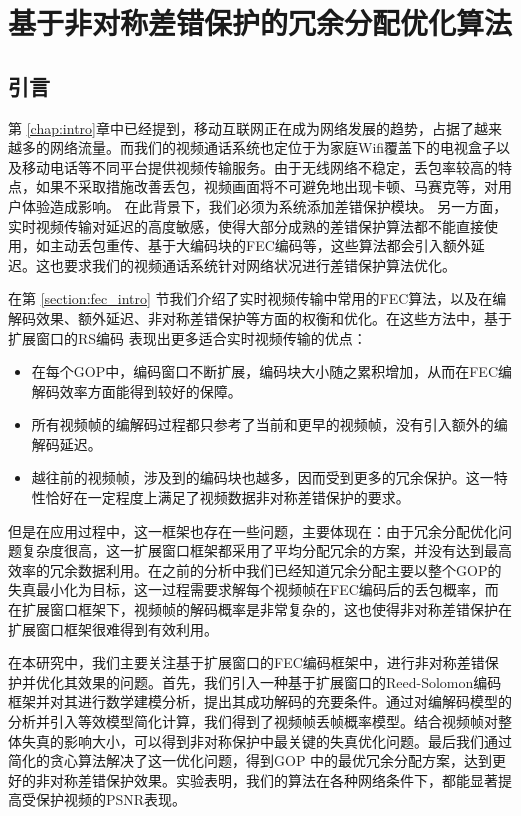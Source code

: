 \chapter{基于非对称差错保护的冗余分配优化算法}
\label{chap:fec}

\section{引言}
第 \ref{chap:intro}章中已经提到，移动互联网正在成为网络发展的趋势，占据了越来越多的网络流量。而我们的视频通话系统也定位于为家庭Wifi覆盖下的电视盒子以及移动电话等不同平台提供视频传输服务。由于无线网络不稳定，丢包率较高的特点，如果不采取措施改善丢包，视频画面将不可避免地出现卡顿、马赛克等，对用户体验造成影响。
在此背景下，我们必须为系统添加差错保护模块。
另一方面，实时视频传输对延迟的高度敏感，使得大部分成熟的差错保护算法都不能直接使用，如主动丢包重传、基于大编码块的FEC编码等，这些算法都会引入额外延迟。这也要求我们的视频通话系统针对网络状况进行差错保护算法优化。

在第 \ref{section:fec_intro} 节我们介绍了实时视频传输中常用的FEC算法，以及在编解码效果、额外延迟、非对称差错保护等方面的权衡和优化。在这些方法中，基于扩展窗口的RS编码 \cite{sejdinovic2009expanding} 表现出更多适合实时视频传输的优点：
\begin{itemize}
    \item 在每个GOP中，编码窗口不断扩展，编码块大小随之累积增加，从而在FEC编解码效率方面能得到较好的保障。
    \item 所有视频帧的编解码过程都只参考了当前和更早的视频帧，没有引入额外的编解码延迟。
    \item 越往前的视频帧，涉及到的编码块也越多，因而受到更多的冗余保护。这一特性恰好在一定程度上满足了视频数据非对称差错保护的要求。
\end{itemize}

但是在应用过程中，这一框架也存在一些问题，主要体现在：由于冗余分配优化问题复杂度很高，这一扩展窗口框架都采用了平均分配冗余的方案，并没有达到最高效率的冗余数据利用。在之前的分析中我们已经知道冗余分配主要以整个GOP的失真最小化为目标，这一过程需要求解每个视频帧在FEC编码后的丢包概率，而在扩展窗口框架下，视频帧的解码概率是非常复杂的，这也使得非对称差错保护在扩展窗口框架很难得到有效利用。

在本研究中，我们主要关注基于扩展窗口的FEC编码框架中，进行非对称差错保护并优化其效果的问题。首先，我们引入一种基于扩展窗口的Reed-Solomon编码框架并对其进行数学建模分析，提出其成功解码的充要条件。通过对编解码模型的分析并引入等效模型简化计算，我们得到了视频帧丢帧概率模型。结合视频帧对整体失真的影响大小，可以得到非对称保护中最关键的失真优化问题。最后我们通过简化的贪心算法解决了这一优化问题，得到GOP 中的最优冗余分配方案，达到更好的非对称差错保护效果。实验表明，我们的算法在各种网络条件下，都能显著提高受保护视频的PSNR表现。


